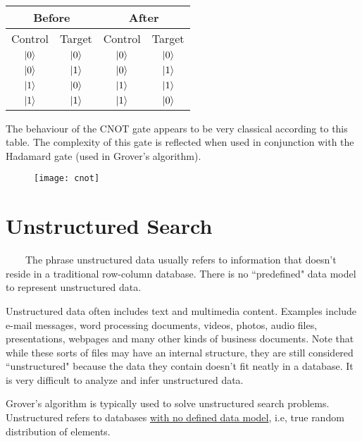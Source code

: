 \documentclass[a4paper]{article}
\begin{document}
\begin{table}[h!]
    \centering
    \begin{tabular}{ |c|c|c|c|  }
        \hline
        \multicolumn{2}{|c}{Before} & \multicolumn{2}{|c|}{After} \\
        \hline
        Control & Target & Control & Target\\
        \hline
        $\ket{0}$ & $\ket{0}$ & $\ket{0}$ & $\ket{0}$ \\
        $\ket{0}$ & $\ket{1}$ & $\ket{0}$ & $\ket{1}$ \\
        $\ket{1}$ & $\ket{0}$ & $\ket{1}$ & $\ket{1}$ \\
        $\ket{1}$ & $\ket{1}$ & $\ket{1}$ & $\ket{0}$ \\
        \hline
    \end{tabular}
\end{table}
The behaviour of the CNOT gate appears to be very classical according to this table. 
The complexity of this gate is reflected when used in conjunction with the Hadamard
gate (used in Grover's algorithm).

\begin{figure}[h]
\texttt{[image: cnot]}
\centering
\end{figure}

\pagebreak


\section{ Unstructured Search }

~~~~The phrase unstructured data usually refers to information that doesn't reside
in a traditional row-column database. There is no ``predefined" data model to 
represent unstructured data.
\\
\par

Unstructured data often includes text and multimedia content. Examples
include e-mail messages, word processing documents, videos, photos, audio
files, presentations, webpages and many other kinds of business documents. Note
that while these sorts of files may have an internal structure, they are still
considered ``unstructured" because the data they contain doesn't fit neatly in a
database. It is very difficult to analyze and infer unstructured data.
\\
\par

Grover's algorithm is typically used to solve unstructured search problems.
Unstructured refers to databases \underline{with no defined data model}, i.e,
true random distribution of elements. 
\\
\par
\end{document}
